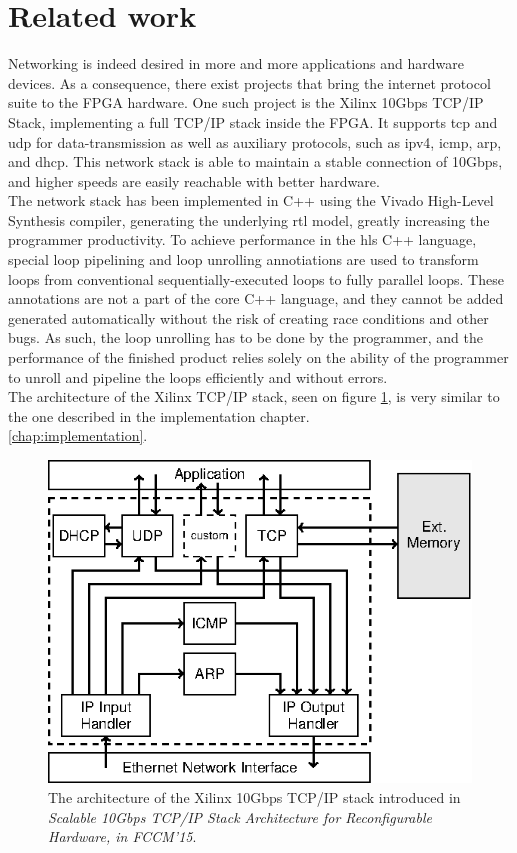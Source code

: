 \section{Related work}
Networking is indeed desired in more and more applications and hardware devices.
As a consequence, there exist projects that bring the internet protocol suite to
the FPGA hardware. One such project is the Xilinx 10Gbps TCP/IP Stack,
implementing a full TCP/IP stack inside the FPGA. It supports \gls{tcp} and
\gls{udp} for data-transmission as well as auxiliary protocols, such as
\gls{ipv4}, \gls{icmp}, \gls{arp}, and \gls{dhcp}.
This network stack is able to maintain a stable connection of 10Gbps, and higher
speeds are easily reachable with better hardware\cite{sidler2015tcp}.\\
The network stack has been implemented in C++ using the Vivado High-Level
Synthesis compiler, generating the underlying \gls{rtl} model, greatly increasing
the programmer productivity.
To achieve performance in the \gls{hls} C++ language, special loop pipelining and
loop unrolling annotiations are used to transform loops from conventional
sequentially-executed loops to fully parallel loops\cite{xilinx_loop_unrolling}.
These annotations are not a part of the core C++ language, and they cannot be
added generated automatically without the risk of creating race conditions and
other bugs. As such, the loop unrolling has to be done by the programmer, and
the performance of the finished product relies solely on the ability of the
programmer to unroll and pipeline the loops efficiently and without errors.\\
The architecture of the Xilinx TCP/IP stack, seen on figure \ref{fig:fccm2015},
is very similar to the one described in the implementation chapter.\\
\ref{chap:implementation}.
\begin{figure}[h]
\centering
\includegraphics[scale=1]{introduction/fccm2015.eps}
\caption{The architecture of the Xilinx 10Gbps TCP/IP stack introduced in
\textit{Scalable 10Gbps TCP/IP Stack Architecture for Reconfigurable Hardware,
in FCCM’15}\cite{sidler2015tcp}.}
\label{fig:fccm2015}
\end{figure}

